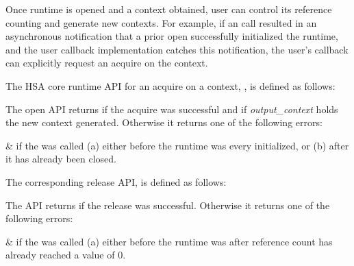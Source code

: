 Once runtime is opened and a context obtained, user can control its
reference counting and generate new contexts. For example, if an
 call resulted in an asynchronous notification that
a prior open successfully initialized the runtime, and the user
callback implementation catches this notification, the user's
callback can explicitly request an acquire on the context.

The HSA core runtime API for an acquire on a context,
, is defined as follows:



The open API returns  if the acquire was
successful and if {\itshape output\_context} holds the new context
generated. Otherwise it returns one of the following errors:

\begin{easylist}
&  if the
 was called (a) either before the
runtime was every initialized, or (b) after it has already been
closed. 
\end{easylist}

The corresponding release API,  is
defined as follows:



The  API returns
 if the release was successful.
Otherwise it returns one of the following errors:

\begin{easylist}
&  if the
 was called (a) either before the
runtime was after reference count has already reached a value of 0.
\end{easylist}

